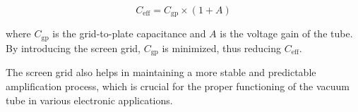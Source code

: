 \[
C_{\text{eff}} = C_{\text{gp}} \times (1 + A)
\]

where \( C_{\text{gp}} \) is the grid-to-plate capacitance and \( A \) is the voltage gain of the tube. By introducing the screen grid, \( C_{\text{gp}} \) is minimized, thus reducing \( C_{\text{eff}} \).

The screen grid also helps in maintaining a more stable and predictable amplification process, which is crucial for the proper functioning of the vacuum tube in various electronic applications.

